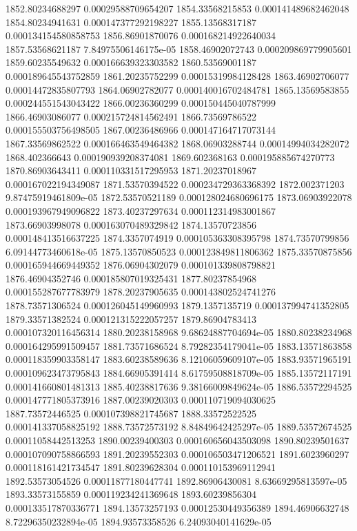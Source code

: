 {1852.80234688297 0.00029588709654207
1854.33568215853 0.000141489682462048
1854.80234941631 0.000147377292198227
1855.13568317187 0.000134154580858753
1856.86901870076 0.000168214922640034
1857.53568621187 7.84975506146175e-05
1858.46902072743 0.000209869779905601
1859.60235549632 0.000166639323303582
1860.53569001187 0.000189645543752859
1861.20235752299 0.00015319984128428
1863.46902706077 0.00014472835807793
1864.06902782077 0.000140016702484781
1865.13569583855 0.000244551543043422
1866.00236360299 0.000150445040787999
1866.46903086077 0.000215724814562491
1866.73569786522 0.000155503756498505
1867.00236486966 0.000147164717073144
1867.33569862522 0.000166463549464382
1868.06903288744 0.00014994034282072
1868.402366643 0.000190939208374081
1869.602368163 0.000195885674270773
1870.86903643411 0.000110331517295953
1871.20237018967 0.000167022194349087
1871.53570394522 0.000234729363368392
1872.002371203 9.87475919461809e-05
1872.53570521189 0.000128024680696175
1873.06903922078 0.000193967949096822
1873.40237297634 0.000112314983001867
1873.66903998078 0.000163070489329842
1874.13570723856 0.000148413516637225
1874.3357074919 0.000105363308395798
1874.73570799856 6.09144773460618e-05
1875.13570850523 0.000123849811806362
1875.33570875856 0.000165944669449352
1876.06904302079 0.000101339808798821
1876.46904352746 0.000185807019325431
1877.80237854968 0.000155287677783979
1878.20237905635 0.000143802524741276
1878.73571306524 0.000126045149960993
1879.1357135719 0.000137994741352805
1879.33571382524 0.000121315222057257
1879.86904783413 0.000107320116456314
1880.20238158968 9.68624887704694e-05
1880.80238234968 0.000164295991509457
1881.73571686524 8.79282354179041e-05
1883.13571863858 0.000118359903358147
1883.60238589636 8.12106059609107e-05
1883.93571965191 0.000109623473795843
1884.66905391414 8.61759508818709e-05
1885.13572117191 0.000141660801481313
1885.40238817636 9.38166009849624e-05
1886.53572294525 0.000147771805373916
1887.00239020303 0.000110719094030625
1887.73572446525 0.000107398821745687
1888.33572522525 0.000141337058825192
1888.73572573192 8.84849642425297e-05
1889.53572674525 0.00011058442513253
1890.00239400303 0.000160656043503098
1890.80239501637 0.000107090758866593
1891.20239552303 0.000106503471206521
1891.6023960297 0.000118161421734547
1891.80239628304 0.000110153969112941
1892.53573054526 0.00011877180447741
1892.86906430081 8.63669295813597e-05
1893.33573155859 0.000119234241369648
1893.60239856304 0.000133517870336771
1894.13573257193 0.00012530449356389
1894.46906632748 8.72296350232894e-05
1894.93573358526 6.24093040141629e-05
}
